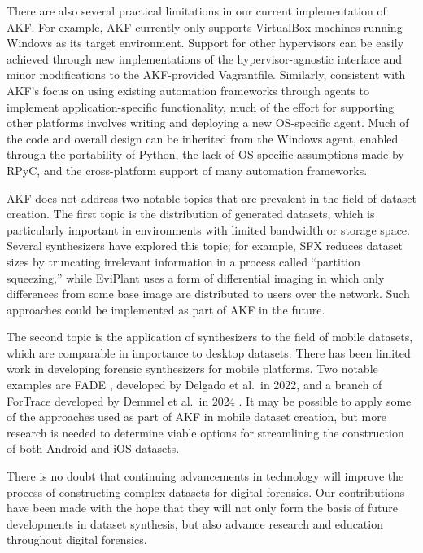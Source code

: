 \documentclass[final,5p,times,twocolumn]{elsarticle}
\begin{document}
There are also several practical limitations in our current
implementation of AKF. For example, AKF currently only supports
VirtualBox machines running Windows as its target environment. Support
for other hypervisors can be easily achieved through new implementations
of the hypervisor-agnostic interface and minor modifications to the
AKF-provided Vagrantfile. Similarly, consistent with AKF's focus on
using existing automation frameworks through agents to implement
application-specific functionality, much of the effort for supporting
other platforms involves writing and deploying a new OS-specific agent.
Much of the code and overall design can be inherited from the Windows
agent, enabled through the portability of Python, the lack of
OS-specific assumptions made by RPyC, and the cross-platform support of
many automation frameworks.

AKF does not address two notable topics that are prevalent in the field
of dataset creation. The first topic is the distribution of generated
datasets, which is particularly important in environments with limited
bandwidth or storage space. Several synthesizers have explored this
topic; for example, SFX \cite{russellForensicImageDescription2012}
reduces dataset sizes by truncating irrelevant information in a process
called ``partition squeezing,'' while EviPlant
\cite{scanlonEviPlantEfficientDigital2017} uses a form of
differential imaging in which only differences from some base image are
distributed to users over the network. Such approaches could be
implemented as part of AKF in the future.

The second topic is the application of synthesizers to the field of
mobile datasets, which are comparable in importance to desktop datasets.
There has been limited work in developing forensic synthesizers for
mobile platforms. Two notable examples are FADE
\cite{ceballosdelgadoFADEForensicImage2022}, developed by Delgado et
al.~in 2022, and a branch of ForTrace developed by Demmel et al.~in 2024
\cite{demmelDataSynthesisGoing2024}. It may be possible to apply
some of the approaches used as part of AKF in mobile dataset creation,
but more research is needed to determine viable options for streamlining
the construction of both Android and iOS datasets.

There is no doubt that continuing advancements in technology will
improve the process of constructing complex datasets for digital
forensics. Our contributions have been made with the hope that they will
not only form the basis of future developments in dataset synthesis, but
also advance research and education throughout digital forensics.

\appendix

 

\end{document}
